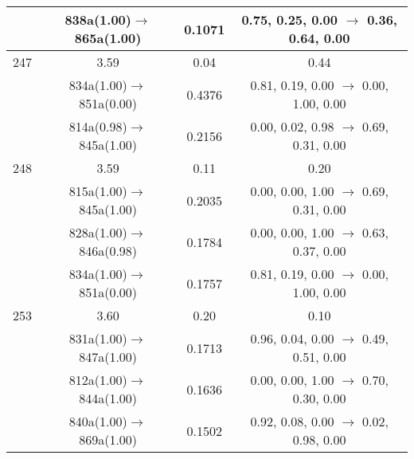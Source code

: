 \documentclass[10pt,a4paper]{article}
\begin{document}
\begin{longtable}{c|c|c|c}
 	& 838a(1.00)$\rightarrow$865a(1.00) &	 0.1071 &	 0.75, 0.25, 0.00 $\rightarrow$ 0.36, 0.64, 0.00 \\ 
 \hline247 &	 3.59 &	 0.04 &	 0.44 \\ 
  	& 834a(1.00)$\rightarrow$851a(0.00) &	 0.4376 &	 0.81, 0.19, 0.00 $\rightarrow$ 0.00, 1.00, 0.00 \\ 
 	& 814a(0.98)$\rightarrow$845a(1.00) &	 0.2156 &	 0.00, 0.02, 0.98 $\rightarrow$ 0.69, 0.31, 0.00 \\ 
 \hline248 &	 3.59 &	 0.11 &	 0.20 \\ 
  	& 815a(1.00)$\rightarrow$845a(1.00) &	 0.2035 &	 0.00, 0.00, 1.00 $\rightarrow$ 0.69, 0.31, 0.00 \\ 
 	& 828a(1.00)$\rightarrow$846a(0.98) &	 0.1784 &	 0.00, 0.00, 1.00 $\rightarrow$ 0.63, 0.37, 0.00 \\ 
 	& 834a(1.00)$\rightarrow$851a(0.00) &	 0.1757 &	 0.81, 0.19, 0.00 $\rightarrow$ 0.00, 1.00, 0.00 \\ 
 \hline253 &	 3.60 &	 0.20 &	 0.10 \\ 
  	& 831a(1.00)$\rightarrow$847a(1.00) &	 0.1713 &	 0.96, 0.04, 0.00 $\rightarrow$ 0.49, 0.51, 0.00 \\ 
 	& 812a(1.00)$\rightarrow$844a(1.00) &	 0.1636 &	 0.00, 0.00, 1.00 $\rightarrow$ 0.70, 0.30, 0.00 \\ 
 	& 840a(1.00)$\rightarrow$869a(1.00) &	 0.1502 &	 0.92, 0.08, 0.00 $\rightarrow$ 0.02, 0.98, 0.00 \\ 
 \hline %
 \end{longtable} 
 
\end{document}
